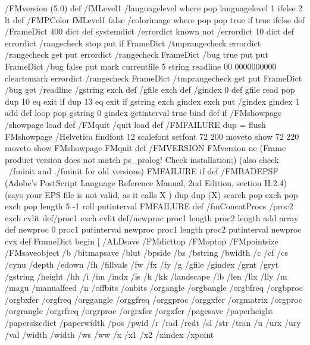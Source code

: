 %
%
/FMversion (5.0) def 
/fMLevel1 /languagelevel where {pop languagelevel} {1} ifelse 2 lt def
/FMPColor
	fMLevel1 {
		false
		/colorimage where {pop pop true} if
	} {
		true
	} ifelse
def
/FrameDict 400 dict def 
systemdict /errordict known not {/errordict 10 dict def
		errordict /rangecheck {stop} put} if
FrameDict /tmprangecheck errordict /rangecheck get put 
errordict /rangecheck {FrameDict /bug true put} put 
FrameDict /bug false put 
mark 
currentfile 5 string readline
00
0000000000
cleartomark 
errordict /rangecheck FrameDict /tmprangecheck get put 
FrameDict /bug get { 
	/readline {
		/gstring exch def
		/gfile exch def
		/gindex 0 def
		{
			gfile read pop 
			dup 10 eq {exit} if 
			dup 13 eq {exit} if 
			gstring exch gindex exch put 
			/gindex gindex 1 add def 
		} loop
		pop 
		gstring 0 gindex getinterval true 
		} bind def
	} if
/FMshowpage /showpage load def
/FMquit /quit load def
/FMFAILURE { 
	dup = flush 
	FMshowpage 
	/Helvetica findfont 12 scalefont setfont
	72 200 moveto show
	72 220 moveto show
	FMshowpage 
	FMquit 
	} def 
/FMVERSION {
	FMversion ne {
		(Frame product version does not match ps_prolog!  Check installation;)
		(also check ~/fminit and ./fminit for old versions) FMFAILURE
		} if
	} def 
/FMBADEPSF { 
	(Adobe's PostScript Language Reference Manual, 2nd Edition, section H.2.4)
	(says your EPS file is not valid, as it calls X              )
	dup dup (X) search pop exch pop exch pop length 
	5 -1 roll 
	putinterval 
	FMFAILURE
	} def
/fmConcatProcs
	{
	/proc2 exch cvlit def/proc1 exch cvlit def/newproc proc1 length proc2 length add array def
	newproc 0 proc1 putinterval newproc proc1 length proc2 putinterval newproc cvx
}def
FrameDict begin [
	/ALDsave
	/FMdicttop
	/FMoptop
	/FMpointsize
	/FMsaveobject
	/b
	/bitmapsave
	/blut
	/bpside
	/bs
	/bstring
	/bwidth
	/c
	/cf
	/cs
	/cynu
	/depth
	/edown
	/fh
	/fillvals
	/fw
	/fx
	/fy
	/g
	/gfile
	/gindex
	/grnt
	/gryt
	/gstring
	/height
	/hh
	/i
	/im
	/indx
	/is
	/k
	/kk
	/landscape
	/lb
	/len
	/llx
	/lly
	/m
	/magu
	/manualfeed
	/n
	/offbits
	/onbits
	/organgle
	/orgbangle
	/orgbfreq
	/orgbproc
	/orgbxfer
	/orgfreq
	/orggangle
	/orggfreq
	/orggproc
	/orggxfer
	/orgmatrix
	/orgproc
	/orgrangle
	/orgrfreq
	/orgrproc
	/orgrxfer
	/orgxfer
	/pagesave
	/paperheight
	/papersizedict
	/paperwidth
	/pos
	/pwid
	/r
	/rad
	/redt
	/sl
	/str
	/tran
	/u
	/urx
	/ury
	/val
	/width
	/width
	/ws
	/ww
	/x
	/x1
	/x2
	/xindex
	/xpoint
